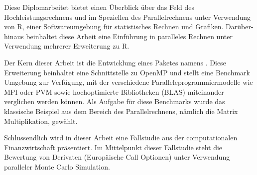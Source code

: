 Diese Diplomarbeitet bietet einen \"Uberblick \"uber das Feld des
Hochleistungsrechnens und im Speziellen des Parallelrechnens unter
Verwendung von R, einer Softwareumgebung f\"ur statistisches Rechnen
und Grafiken. Dar\"uber- hinaus beinhaltet diese Arbeit eine Einf\"uhrung %
in paralleles Rechnen unter Verwendung mehrerer Erweiterung zu R.

Der Kern dieser Arbeit ist die Entwicklung eines
Paketes namens  . Diese Erweiterung beinhaltet eine
Schnittstelle zu OpenMP und stellt eine Benchmark Umgebung zur
Verf\"ugung, mit der verschiedene Paralleleprogrammiermodelle wie MPI oder
PVM sowie hochoptimierte Bibliotheken (BLAS) miteinander verglichen
werden k\"onnen. Als Aufgabe f\"ur diese Benchmarks wurde das
klassische Beispiel aus dem Bereich des Parallelrechnens, n\"amlich
die Matrix Multiplikation, gew\"ahlt.

Schlussendlich wird in dieser Arbeit eine Fallstudie aus der
computationalen Finanzwirtschaft pr\"asentiert. Im Mittelpunkt dieser
Fallstudie steht die Bewertung von Derivaten (Europ\"aische Call
Optionen) unter Verwendung paralleler Monte Carlo Simulation.

